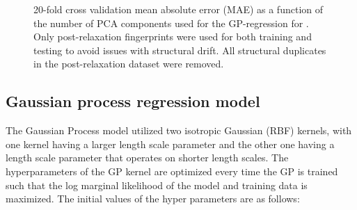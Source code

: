\begin{figure}[!htb]
\centering
{}
\caption{\label{fig:cv_anal}
%
20-fold cross validation mean absolute error (MAE) as a function of the number of PCA components used for the GP-regression for \IrOthree.
%
Only post-relaxation fingerprints were used for both training and testing to avoid issues with structural drift.
%
All structural duplicates in the post-relaxation dataset were removed.
}
\end{figure}



\subsection{Gaussian process regression model}  %
%
%
The Gaussian Process model utilized two isotropic Gaussian (RBF) kernels, with one kernel having a larger length scale parameter and the other one having a length scale parameter that operates on shorter length scales.
%
The hyperparameters of the GP kernel are optimized every time the GP is trained such that the log marginal likelihood of the model and training data is maximized.
%
The initial values of the hyper parameters are as follows:

